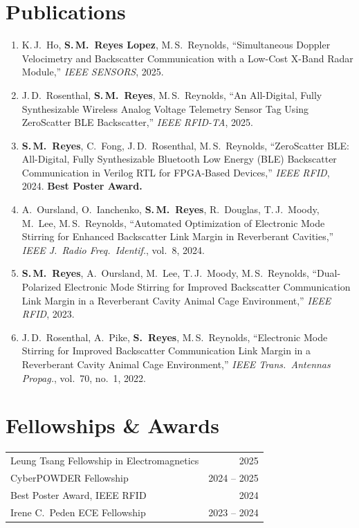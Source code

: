 \documentclass[10pt,letterpaper]{article}
\newcommand{\me}[1]{\textbf{#1}}
\begin{document}
\section{Publications}
\begin{enumerate}[leftmargin=1.6em, itemsep=3pt, label={\color{accent}\arabic*.}]
  \item K.\,J.\ Ho, \me{S.\,M.\ Reyes Lopez}, M.\,S.\ Reynolds, ``Simultaneous Doppler Velocimetry and Backscatter Communication with a Low-Cost X-Band Radar Module,'' \textit{IEEE SENSORS}, 2025.
  \item J.\,D.\ Rosenthal, \me{S.\,M.\ Reyes}, M.\,S.\ Reynolds, ``An All-Digital, Fully Synthesizable Wireless Analog Voltage Telemetry Sensor Tag Using ZeroScatter BLE Backscatter,'' \textit{IEEE RFID-TA}, 2025.
  \item \me{S.\,M.\ Reyes}, C.\ Fong, J.\,D.\ Rosenthal, M.\,S.\ Reynolds, ``ZeroScatter BLE: All-Digital, Fully Synthesizable Bluetooth Low Energy (BLE) Backscatter Communication in Verilog RTL for FPGA-Based Devices,'' \textit{IEEE RFID}, 2024. \textbf{\color{accent}Best Poster Award.}
  \item A.\ Oursland, O.\ Ianchenko, \me{S.\,M.\ Reyes}, R.\ Douglas, T.\,J.\ Moody, M.\ Lee, M.\,S.\ Reynolds, ``Automated Optimization of Electronic Mode Stirring for Enhanced Backscatter Link Margin in Reverberant Cavities,'' \textit{IEEE J.\ Radio Freq.\ Identif.}, vol.~8, 2024.
  \item \me{S.\,M.\ Reyes}, A.\ Oursland, M.\ Lee, T.\,J.\ Moody, M.\,S.\ Reynolds, ``Dual-Polarized Electronic Mode Stirring for Improved Backscatter Communication Link Margin in a Reverberant Cavity Animal Cage Environment,'' \textit{IEEE RFID}, 2023.
  \item J.\,D.\ Rosenthal, A.\ Pike, \me{S.\ Reyes}, M.\,S.\ Reynolds, ``Electronic Mode Stirring for Improved Backscatter Communication Link Margin in a Reverberant Cavity Animal Cage Environment,'' \textit{IEEE Trans.\ Antennas Propag.}, vol.~70, no.~1, 2022.
\end{enumerate}

\section{Fellowships \& Awards}
\begin{tabularx}{\linewidth}{@{}X r@{}}
  Leung Tsang Fellowship in Electromagnetics & \textcolor{muted}{2025}\\
  CyberPOWDER Fellowship & \textcolor{muted}{2024 -- 2025}\\
  Best Poster Award, IEEE RFID & \textcolor{muted}{2024}\\
  Irene C.\ Peden ECE Fellowship & \textcolor{muted}{2023 -- 2024}\\
\end{tabularx}
\end{document}
